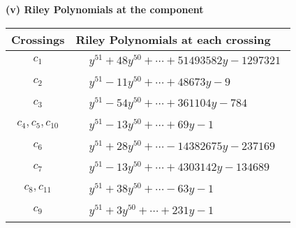 \documentclass[1p]{elsarticle_modified}
\theoremstyle{definition}
\begin{document}
\newpage\renewcommand{\arraystretch}{1}
\flushleft \textbf{(v) Riley Polynomials at the component}\newline \\
\begin{tabular}{m{50pt}|m{274pt}}
Crossings & \hspace{64pt}Riley Polynomials at each crossing \\
\hline $$\begin{aligned}c_{1}\end{aligned}$$&$\begin{aligned}
&y^{51}+48 y^{50}+\cdots+51493582 y-1297321
\end{aligned}$\\
\hline $$\begin{aligned}c_{2}\end{aligned}$$&$\begin{aligned}
&y^{51}-11 y^{50}+\cdots+48673 y-9
\end{aligned}$\\
\hline $$\begin{aligned}c_{3}\end{aligned}$$&$\begin{aligned}
&y^{51}-54 y^{50}+\cdots+361104 y-784
\end{aligned}$\\
\hline $$\begin{aligned}c_{4},c_{5},c_{10}\end{aligned}$$&$\begin{aligned}
&y^{51}-13 y^{50}+\cdots+69 y-1
\end{aligned}$\\
\hline $$\begin{aligned}c_{6}\end{aligned}$$&$\begin{aligned}
&y^{51}+28 y^{50}+\cdots-14382675 y-237169
\end{aligned}$\\
\hline $$\begin{aligned}c_{7}\end{aligned}$$&$\begin{aligned}
&y^{51}-13 y^{50}+\cdots+4303142 y-134689
\end{aligned}$\\
\hline $$\begin{aligned}c_{8},c_{11}\end{aligned}$$&$\begin{aligned}
&y^{51}+38 y^{50}+\cdots-63 y-1
\end{aligned}$\\
\hline $$\begin{aligned}c_{9}\end{aligned}$$&$\begin{aligned}
&y^{51}+3 y^{50}+\cdots+231 y-1
\end{aligned}$\\
\hline
\end{tabular}\\~\\
\end{document}
